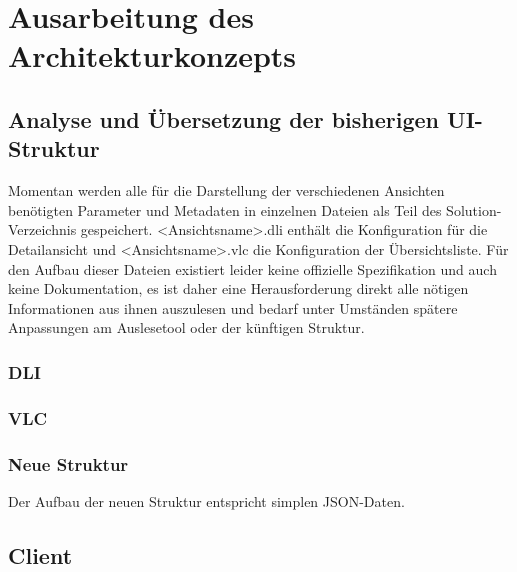 \chapter{Ausarbeitung des Architekturkonzepts}\label{chap:concept}
\section{Analyse und Übersetzung der bisherigen UI-Struktur}\label{sec:ui_structure_translation}
Momentan werden alle für die Darstellung der verschiedenen Ansichten benötigten Parameter und Metadaten in einzelnen Dateien als Teil des Solution-Verzeichnis gespeichert. <Ansichtsname>.dli enthält die Konfiguration für die Detailansicht und <Ansichtsname>.vlc die Konfiguration der Übersichtsliste. Für den Aufbau dieser Dateien existiert leider keine offizielle Spezifikation und auch keine Dokumentation, es ist daher eine Herausforderung direkt alle nötigen Informationen aus ihnen auszulesen und bedarf unter Umständen spätere Anpassungen am Auslesetool oder der künftigen Struktur.

\subsection{DLI}
\subsection{VLC}
\subsection{Neue Struktur}
Der Aufbau der neuen Struktur entspricht simplen JSON-Daten. 

\section{Client}

